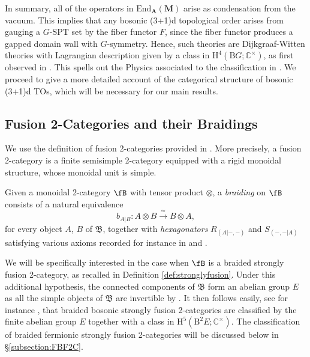 \documentclass[11pt,reqno]{amsart}
\newcommand{\rH}{\mathrm{H}}
\newcommand{\rB}{\mathrm{B}}
\numberwithin{equation}{section}
\theoremstyle{plain}
\theoremstyle{definition}
\newcommand\define[1]{\emph{#1}}
\begin{document}
In summary, all of the operators in $\mathrm{End}_{\mathbf{A}}(\mathbf{M})$ arise as condensation from the vacuum. This implies that any bosonic (3+1)d topological order arises from gauging a $G$-SPT set by the fiber functor $F$, since the fiber functor produces a gapped domain wall with $G$-symmetry. Hence, such theories are Dijkgraaf-Witten theories with Lagrangian description given by a class in $\rH^4(\rB G ;\mathbb C^\times)$, as first observed in \cite{Lan_2018}. This spells out the Physics associated to the classification in . We proceed to give a more detailed account of the categorical structure of bosonic (3+1)d TOs, which will be necessary for our main results.

\subsection{Fusion 2-Categories and their Braidings}

We use the definition of fusion 2-categories provided in \cite{douglas2018fusion}. More precisely, a fusion 2-category is a finite semisimple 2-category equipped with a rigid monoidal structure, whose monoidal unit is simple.

Given a monoidal 2-category $\fB$ with tensor product $\otimes$, a \textit{braiding} on $\fB$ consists of a natural equivalence 
\begin{equation}\label{eq:braidingF2C}
    b_{A|B}:A \otimes B \xrightarrow{\simeq} B \otimes A,
\end{equation}
for every object $A$, $B$ of $\mathfrak{B}$,
together with \define{hexagonators} $R_{(A|-,-)}$ and $S_{(-,-|A)}$ satisfying various axioms recorded for instance in \cite{SP} and \cite[Section 2.1.1]{Decoppet:2022dnz}.

We will be specifically interested in the case when $\fB$ is a braided strongly fusion 2-category, as recalled in Definition \ref{def:stronglyfusion}. Under this additional hypothesis, the connected components of $\mathfrak{B}$ form an abelian group $E$ as all the simple objects of $\mathfrak{B}$ are invertible by \cite{JFY}. It then follows easily, see for instance \cite[Section 2.2]{JFY2}, that braided bosonic strongly fusion 2-categories are classified by the finite abelian group $E$ together with a class in $\rH^5(\rB^2 E; \mathbb{C}^\times)$. The classification of braided fermionic strongly fusion 2-categories will be discussed below in \S\ref{subsection:FBF2C}.
\end{document}
